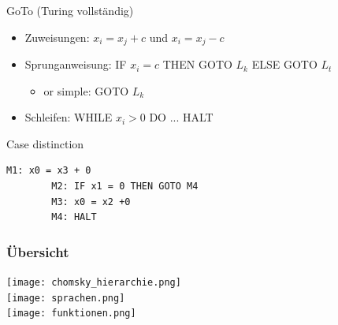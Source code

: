 \begin{KR}{GoTo (Turing vollständig)}
    \begin{itemize}
        \item Zuweisungen: $x_i = x_j + c$ und $x_i = x_j - c$
        \item Sprunganweisung: IF $x_i = c$ THEN GOTO $L_k$ ELSE GOTO $L_t$
        \begin{itemize}
            \item or simple: GOTO $L_k$
        \end{itemize}
        \item Schleifen: WHILE $x_i > 0$ DO ... HALT
    \end{itemize}
\end{KR}

\begin{example2}{Case distinction}
    \begin{lstlisting}[style=Pseudocode]
        M1: x0 = x3 + 0
        M2: IF x1 = 0 THEN GOTO M4
        M3: x0 = x2 +0
        M4: HALT
    \end{lstlisting}
\end{example2}

\subsubsection*{Übersicht}
\texttt{[image: chomsky\_hierarchie.png]}\\
\texttt{[image: sprachen.png]}\\
\texttt{[image: funktionen.png]}